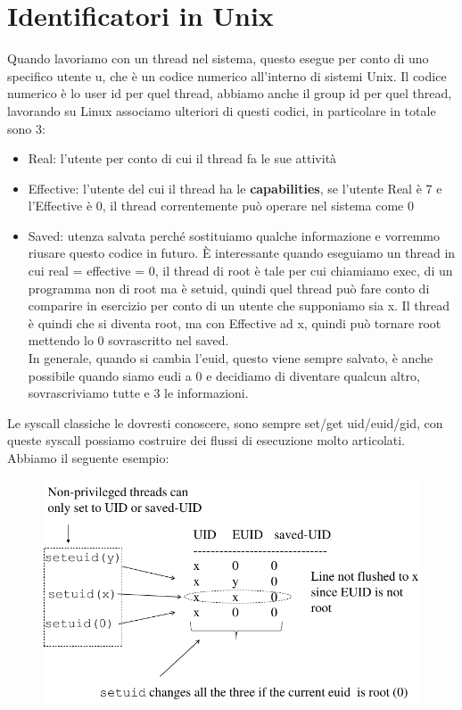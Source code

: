 \documentclass[12pt, oneside]{extbook}
\begin{document}
\section{Identificatori in Unix}
Quando lavoriamo con un thread nel sistema, questo esegue per conto di uno specifico utente u, che è un codice numerico all'interno di sistemi Unix. Il codice numerico è lo user id per quel thread, abbiamo anche il group id per quel thread, lavorando su Linux associamo ulteriori di questi codici, in particolare in totale sono 3:
\begin{itemize}
	\item Real: l'utente per conto di cui il thread fa le sue attività
	\item Effective: l'utente del cui il thread ha le \textbf{capabilities}, se l'utente Real è 7 e l'Effective è 0, il thread correntemente può operare nel sistema come 0
	\item Saved: utenza salvata perché sostituiamo qualche informazione e vorremmo riusare questo codice in futuro. È interessante quando eseguiamo un thread in cui real = effective = 0, il thread di root è tale per cui chiamiamo exec, di un programma non di root ma è setuid, quindi quel thread può fare conto di comparire in esercizio per conto di un utente che supponiamo sia x. Il thread è quindi che si diventa root, ma con Effective ad x, quindi può tornare root mettendo lo 0 sovrascritto nel saved.\\In generale, quando si cambia l'euid, questo viene sempre salvato, è anche possibile quando siamo eudi a 0 e decidiamo di diventare qualcun altro, sovrascriviamo tutte e 3 le informazioni.
\end{itemize}
Le syscall classiche le dovresti conoscere, sono sempre set/get uid/euid/gid, con queste syscall possiamo costruire dei flussi di esecuzione molto articolati. Abbiamo il seguente esempio:
\begin{figure}[!h]
	\includegraphics[scale=0.5]{immagini/id_examples.png}
\end{figure}
\end{document}
